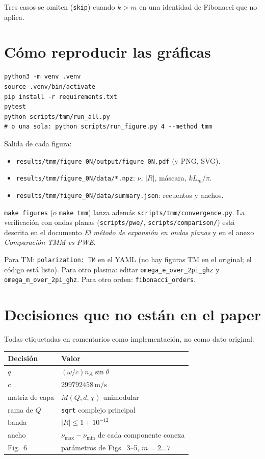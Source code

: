\documentclass[11pt,a4paper]{article}
\begin{document}
Tres casos se omiten (\texttt{skip}) cuando \(k>m\) en una identidad de
Fibonacci que no aplica.

\section{Cómo reproducir las gráficas}

\begin{lstlisting}
python3 -m venv .venv
source .venv/bin/activate
pip install -r requirements.txt
pytest
python scripts/tmm/run_all.py
# o una sola: python scripts/run_figure.py 4 --method tmm
\end{lstlisting}

Salida de cada figura:

\begin{itemize}
\item \texttt{results/tmm/figure\_0N/output/figure\_0N.pdf} (y PNG, SVG).
\item \texttt{results/tmm/figure\_0N/data/*.npz}: \(\nu\), \(\lvert R\rvert\),
máscara, \(k L_m/\pi\).
\item \texttt{results/tmm/figure\_0N/data/summary.json}: recuentos y anchos.
\end{itemize}

\texttt{make figures} (o \texttt{make tmm}) lanza además
\texttt{scripts/tmm/convergence.py}. La verificación con ondas planas
(\texttt{scripts/pwe/}, \texttt{scripts/comparison/}) está descrita en el
documento \textit{El método de expansión en ondas planas} y en el anexo
\textit{Comparación TMM vs PWE}.

Para TM: \texttt{polarization: TM} en el YAML (no hay figuras TM en el
original; el código está listo).
Para otro plasma: editar \texttt{omega\_e\_over\_2pi\_ghz} y
\texttt{omega\_m\_over\_2pi\_ghz}.
Para otro orden: \texttt{fibonacci\_orders}.

\section{Decisiones que no están en el paper}

Todas etiquetadas en comentarios como implementación, no como dato original:

\begin{center}
\begin{tabular}{ll}
\toprule
Decisión & Valor \\
\midrule
\(q\) & \((\omega/c)n_A\sin\theta\) \\
\(c\) & \(299792458\,\mathrm{m/s}\) \\
matriz de capa & \(M(Q,d,\chi)\) unimodular \\
rama de \(Q\) & \texttt{sqrt} complejo principal \\
banda & \(\lvert R\rvert\le 1+10^{-12}\) \\
ancho & \(\nu_{\max}-\nu_{\min}\) de cada componente conexa \\
Fig.~6 & parámetros de Figs.~3--5, \(m=2\ldots 7\) \\
\bottomrule
\end{tabular}
\end{center}
\end{document}
